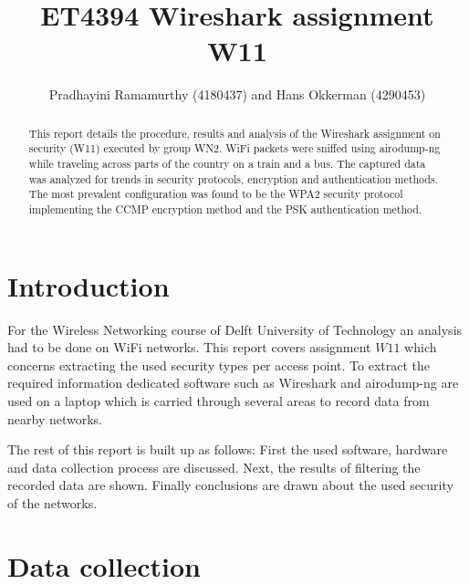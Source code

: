 \documentclass[letterpaper, 10 pt, conference]{ieeeconf}  %
\title{\LARGE \bf
ET4394 Wireshark assignment W11
}
\author{Pradhayini Ramamurthy (4180437) and Hans Okkerman (4290453)%
}
\begin{document}
\maketitle
\thispagestyle{empty}
\pagestyle{empty}


\begin{abstract}

This report details the procedure, results and analysis of the Wireshark assignment on security (W11) executed by group WN2. WiFi packets were sniffed using airodump-ng while traveling across parts of the country on a train and a bus. The captured data was analyzed for trends in security protocols, encryption and authentication methods. The most prevalent configuration was found to be the WPA2 security protocol implementing the CCMP encryption method and the PSK authentication method.

\end{abstract}


\section{Introduction}
For the Wireless Networking course of Delft University of Technology an analysis had to be done on WiFi networks. This report covers assignment $W11$ which concerns extracting the used security types per access point. To extract the required information dedicated software such as Wireshark and airodump-ng are used on a laptop which is carried through several areas to record data from nearby networks. 

The rest of this report is built up as follows: First the used software, hardware and data collection process are discussed. Next, the results of filtering the recorded data are shown. Finally conclusions are drawn about the used security of the networks. 



\section{Data collection}
\end{document}
